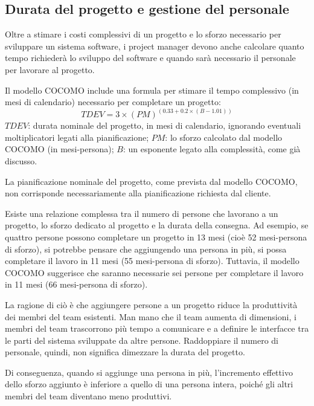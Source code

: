 \subsection{Durata del progetto e gestione del personale}
Oltre a stimare i costi complessivi di un progetto e lo sforzo necessario per sviluppare un sistema software, i project manager devono anche calcolare quanto tempo richiederà lo sviluppo del software e quando sarà necessario il personale per lavorare al progetto.

Il modello COCOMO include una formula per stimare il tempo complessivo (in mesi di calendario) necessario per completare un progetto:
\begin{equation*}
    TDEV=3\times(PM)^{(0.33+0.2\times(B-1.01))}
\end{equation*}
$TDEV$: durata nominale del progetto, in mesi di calendario, ignorando eventuali moltiplicatori legati alla pianificazione; $PM$: lo sforzo calcolato dal modello COCOMO (in mesi-persona); $B$: un esponente legato alla complessità, come già discusso.

La pianificazione nominale del progetto, come prevista dal modello COCOMO, non corrisponde necessariamente alla pianificazione richiesta dal cliente. 

Esiste una relazione complessa tra il numero di persone che lavorano a un progetto, lo sforzo dedicato al progetto e la durata della consegna. Ad esempio, se quattro persone possono completare un progetto in 13 mesi (cioè 52 mesi-persona di sforzo), si potrebbe pensare che aggiungendo una persona in più, si possa completare il lavoro in 11 mesi (55 mesi-persona di sforzo). Tuttavia, il modello COCOMO suggerisce che saranno necessarie sei persone per completare il lavoro in 11 mesi (66 mesi-persona di sforzo).

La ragione di ciò è che aggiungere persone a un progetto riduce la produttività dei membri del team esistenti. Man mano che il team aumenta di dimensioni, i membri del team trascorrono più tempo a comunicare e a definire le interfacce tra le parti del sistema sviluppate da altre persone. Raddoppiare il numero di personale, quindi, non significa dimezzare la durata del progetto.

Di conseguenza, quando si aggiunge una persona in più, l'incremento effettivo dello sforzo aggiunto è inferiore a quello di una persona intera, poiché gli altri membri del team diventano meno produttivi.


